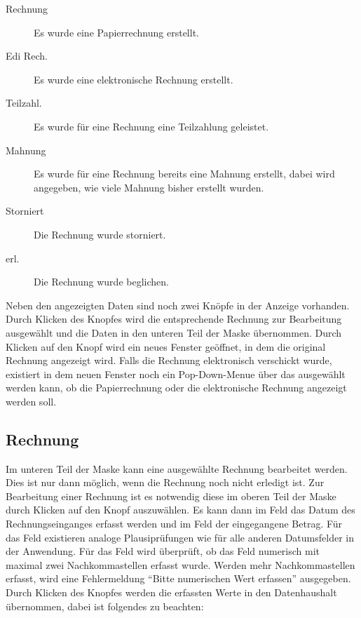 \begin{description}
\item[Rechnung] 
Es wurde eine Papierrechnung erstellt.
\item[Edi Rech.] 
Es wurde eine elektronische Rechnung erstellt.
\item[Teilzahl.] 
Es wurde für eine Rechnung eine Teilzahlung geleistet.
\item[Mahnung] 
Es wurde für eine Rechnung bereits eine Mahnung erstellt, 
dabei wird angegeben, wie viele Mahnung bisher erstellt wurden.
\item[Storniert]
Die Rechnung wurde storniert.
\item[erl.]
Die Rechnung wurde beglichen.
\end{description}

Neben den angezeigten Daten sind noch zwei Knöpfe in der Anzeige vorhanden.
Durch Klicken des Knopfes  wird die entsprechende
Rechnung zur Bearbeitung ausgewählt und die Daten in den unteren Teil
der Maske übernommen. Durch Klicken auf den Knopf  wird
ein neues Fenster geöffnet, in dem die original Rechnung angezeigt wird.
Falls die Rechnung elektronisch verschickt wurde, existiert in dem
neuen Fenster noch ein Pop-Down-Menue über das ausgewählt werden kann, ob 
die Papierrechnung oder die elektronische Rechnung angezeigt werden soll.

\subsection{Rechnung}
Im unteren Teil der Maske kann eine ausgewählte Rechnung bearbeitet werden.
Dies ist nur dann möglich, wenn die Rechnung noch nicht erledigt ist. Zur
Bearbeitung einer Rechnung ist es notwendig diese im oberen Teil der Maske
durch Klicken auf den Knopf 
 auszuwählen. Es kann dann im Feld  das
Datum des Rechnungseinganges erfasst werden und im Feld
 der eingegangene Betrag. Für das Feld 
existieren analoge Plausiprüfungen wie für alle anderen Datumsfelder in der
Anwendung. Für das Feld  wird überprüft, 
ob das Feld numerisch
mit maximal zwei Nachkommastellen erfasst wurde. Werden mehr Nachkommastellen
erfasst, wird eine Fehlermeldung ``Bitte numerischen Wert erfassen'' 
ausgegeben. Durch Klicken des Knopfes  werden die erfassten
Werte in den Datenhaushalt übernommen, dabei ist folgendes zu beachten:

